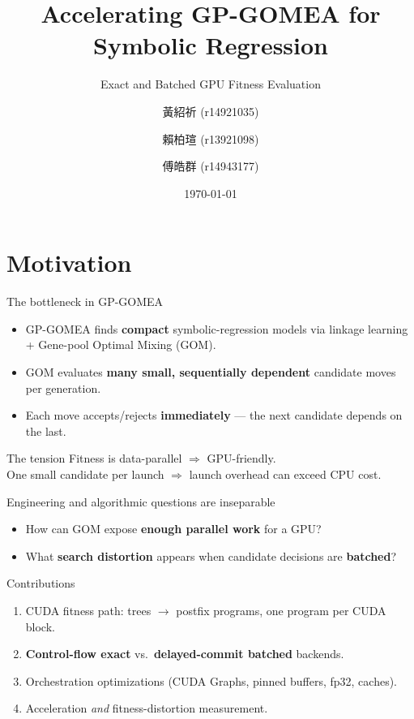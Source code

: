 \documentclass[aspectratio=169,11pt]{beamer}
\title[GPU GP-GOMEA]{Accelerating GP-GOMEA for Symbolic Regression}
\subtitle{Exact and Batched GPU Fitness Evaluation}
\author[Team 31]{黃紹祈 (r14921035) \and 賴柏瑄 (r13921098) \and 傅皓群 (r14943177)}
\institute{Team 31}
\date{\today}
\newcommand{\gpgomea}{GP-GOMEA\xspace}
\begin{document}
\begin{frame}[plain]
  \titlepage
\end{frame}

\section{Motivation}

\begin{frame}{The bottleneck in GP-GOMEA}
  \begin{itemize}
    \item \gpgomea finds \textbf{compact} symbolic-regression models via linkage learning + Gene-pool Optimal Mixing (GOM).
    \item GOM evaluates \textbf{many small, sequentially dependent} candidate moves per generation.
    \item Each move accepts/rejects \textbf{immediately} — the next candidate depends on the last.
  \end{itemize}
  \vfill
  \begin{block}{The tension}
    Fitness is data-parallel $\Rightarrow$ GPU-friendly.\\
    One small candidate per launch $\Rightarrow$ launch overhead can exceed CPU cost.
  \end{block}
\end{frame}

\begin{frame}{Engineering and algorithmic questions are inseparable}
  \begin{itemize}
    \item How can GOM expose \textbf{enough parallel work} for a GPU?
    \item What \textbf{search distortion} appears when candidate decisions are \textbf{batched}?
  \end{itemize}
  \vfill
  \begin{exampleblock}{Contributions}
    \begin{enumerate}
      \item CUDA fitness path: trees $\to$ postfix programs, one program per CUDA block.
      \item \textbf{Control-flow exact} vs.\ \textbf{delayed-commit batched} backends.
      \item Orchestration optimizations (CUDA Graphs, pinned buffers, fp32, caches).
      \item Acceleration \emph{and} fitness-distortion measurement.
    \end{enumerate}
  \end{exampleblock}
\end{frame}
\end{document}
